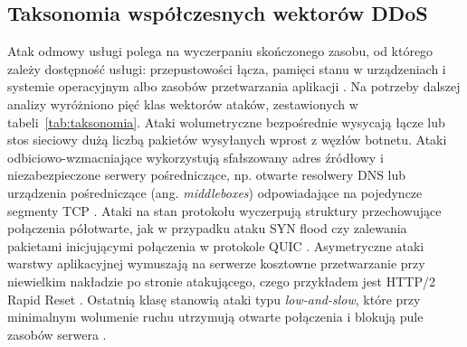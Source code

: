 \documentclass[a4paper,12pt]{article}
\begin{document}
\subsection{Taksonomia współczesnych wektorów DDoS}\label{sec:taksonomia}
Atak odmowy usługi polega na wyczerpaniu skończonego zasobu, od którego zależy dostępność usługi: przepustowości łącza, pamięci stanu w urządzeniach i systemie operacyjnym albo zasobów przetwarzania aplikacji \cite{rfc4732}. Na potrzeby dalszej analizy wyróżniono pięć klas wektorów ataków, zestawionych w tabeli~\ref{tab:taksonomia}. Ataki wolumetryczne bezpośrednie wysycają łącze lub stos sieciowy dużą liczbą pakietów wysyłanych wprost z węzłów botnetu. Ataki odbiciowo-wzmacniające wykorzystują sfałszowany adres źródłowy i niezabezpieczone serwery pośredniczące, np. otwarte resolwery DNS \cite{nawrocki2021far} lub urządzenia pośredniczące (ang. \textit{middleboxes}) odpowiadające na pojedyncze segmenty TCP \cite{bock2021weaponizing}. Ataki na stan protokołu wyczerpują struktury przechowujące połączenia półotwarte, jak w przypadku ataku SYN flood \cite{rfc4987} czy zalewania pakietami inicjującymi połączenia w protokole QUIC \cite{nawrocki2021quicsand}. Asymetryczne ataki warstwy aplikacyjnej wymuszają na serwerze kosztowne przetwarzanie przy niewielkim nakładzie po stronie atakującego, czego przykładem jest HTTP/2 Rapid Reset \cite{pardue2023rapidreset}. Ostatnią klasę stanowią ataki typu \textit{low-and-slow}, które przy minimalnym wolumenie ruchu utrzymują otwarte połączenia i blokują pule zasobów serwera \cite{sikora2021generator,sood2023slowtrack,tripathi2024delays}.
\end{document}
